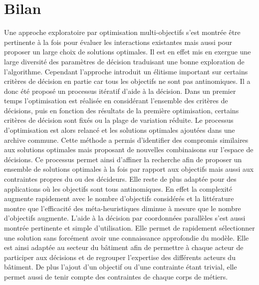 \section{Bilan} %
\label{sec:bilan_aide_decision}
Une approche exploratoire par optimisation multi-objectifs s’est montrée être pertinente à
la fois pour évaluer les interactions existantes mais aussi pour proposer un large choix
de solutions optimales. Il est en effet mis en exergue une large diversité des paramètres
de décision traduisant une bonne exploration de l’algorithme. Cependant l’approche
introduit un élitisme important sur certains critères de décision en partie car tous les
objectifs ne sont pas antinomiques. Il a donc été proposé un processus itératif d’aide à
la décision. Dans un premier temps l’optimisation est réalisée en considérant l’ensemble
des critères de décisions, puis en fonction des résultats de la première optimisation,
certains critères de décision sont fixés ou la plage de variation réduite. Le processus
d’optimisation est alors relancé et les solutions optimales ajoutées dans une archive
commune. Cette méthode a permis d’identifier des compromis similaires aux solutions
optimales mais proposant de nouvelles combinaisons sur l’espace de décisions. Ce processus
permet ainsi d’affiner la recherche afin de proposer un ensemble de solutions optimales à
la fois par rapport aux objectifs mais aussi aux contraintes propres du ou des décideurs.
Elle reste de plus adaptée pour des applications où les objectifs sont tous antinomiques.
En effet la complexité augmente rapidement avec le nombre d’objectifs considérés et la
littérature montre que l’efficacité des méta-heuristiques diminue à mesure que le
nombre d’objectifs augmente. L’aide à la décision par coordonnées parallèles s’est aussi
montrée pertinente et simple d’utilisation. Elle permet de rapidement sélectionner une
solution sans forcément avoir une connaissance approfondie du modèle. Elle est ainsi
adaptée au secteur du bâtiment afin de permettre à chaque acteur de participer aux
décisions et de regrouper l’expertise des différents acteurs du bâtiment. De plus l’ajout d’un objectif
ou d’une contrainte étant trivial, elle permet aussi de tenir compte des contraintes de chaque corps de métiers.

